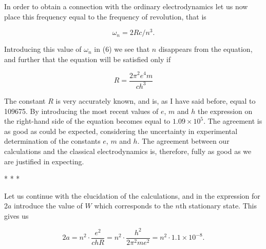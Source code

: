 In order to obtain a connection with the ordinary electrodynamics let us
now place this frequency equal to the frequency of revolution, that is

\begin{equation*}
\omega_n = 2Rc/n^3 .
\end{equation*}

Introducing this value of $\omega_n$ in (6) we see that $n$
disappears from the equation, and further that the equation will be
satisfied only if

\begin{equation}
R = \frac{2\pi^2e^4m}{ch^3}
\end{equation}

The constant $R$ is very accurately known, and is, as I have said
before, equal to 109675. By introducing the most recent values of
$e$, $m$ and $h$ the expression on the right-hand side of
the equation becomes equal to $1.09\!\times\!10^5$. The agreement is as good as
could be expected, considering the uncertainty in experimental
determination of the constants $e$, $m$ and $h$. The
agreement between our calculations and the classical electrodynamics is,
therefore, fully as good as we are justified in expecting.\\
\centerline{* * *}
%
Let us continue with the elucidation of the calculations, and in the
expression for 2$a$ introduce the value of $W$ which
corresponds to the $n$th stationary state. This gives us

\begin{equation}
2a = n^2 \cdot \frac{e^2}{chR} = n^2 \cdot \frac{h^2}{2\pi^2me^2} = n^2 \cdot 1.1\!\times\!10^{-8} .
\end{equation}

